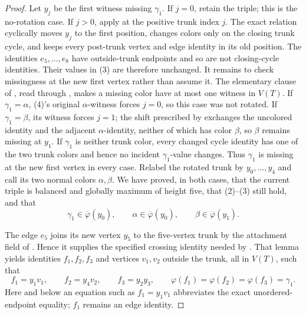\begin{proof}
Let $y_j$ be the first witness missing $\gamma_1$.  If $j=0$, retain the
triple; this is the no-rotation case.  If $j>0$, apply
 at the positive trunk index $j$.
The exact relation  cyclically moves $y_j$ to the
first position, changes colors only on the closing trunk cycle, and keeps
every post-trunk vertex and edge identity in its old position.  The
identities $e_5,\ldots,e_8$ have outside-trunk endpoints and so are not
closing-cycle identities.  Their values in (3) are therefore unchanged.
It remains to check missingness at the new first vertex rather than assume
it.  The elementary clause of , read
through , makes a missing color have
at most one witness in $V(T)$.  If $\gamma_1=\alpha$, (4)'s original
$\alpha$-witness forces $j=0$, so this case was not rotated.  If
$\gamma_1=\beta$, its witness forces $j=1$; the shift prescribed by
 exchanges the uncolored identity and the adjacent
$\alpha$-identity, neither of which has color $\beta$, so $\beta$ remains
missing at $y_1$.  If $\gamma_1$ is neither trunk color, every changed
cycle identity has one of the two trunk colors and hence no incident
$\gamma_1$-value changes.  Thus $\gamma_1$ is missing at the new first
vertex in every case.  Relabel
the rotated trunk by $y_0,\ldots,y_4$ and call its two normal colors
$\alpha,\beta$.  We have proved, in both cases, that the current triple is
balanced and globally maximum of height five, that (2)--(3) still hold,
and that
\[
 \gamma_1\in\overline\varphi(y_0),\qquad
 \alpha\in\overline\varphi(y_0),\qquad
 \beta\in\overline\varphi(y_1).                    \tag{4}
\]

The edge $e_5$ joins its new vertex $y_5$ to the five-vertex trunk by the
attachment field of .  Hence it supplies the
specified crossing identity needed by
.  That lemma yields identities
$f_1,f_2,f_3$ and vertices $v_1,v_2$ outside the trunk, all in $V(T)$,
such that
\[
 f_1=y_1v_1,\qquad f_2=y_4v_2,\qquad f_3=y_2y_3,
 \qquad
 \varphi(f_1)=\varphi(f_2)=\varphi(f_3)=\gamma_1.   \tag{5}
\]
Here and below an equation such as $f_1=y_1v_1$ abbreviates the exact
unordered-endpoint equality; $f_1$ remains an edge identity.


\end{proof}
